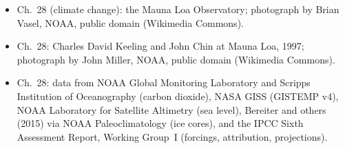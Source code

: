 \begin{itemize}
  \item Ch.~28 (climate change): the Mauna Loa Observatory; photograph by Brian Vasel, NOAA, public domain (Wikimedia Commons).
  \item Ch.~28: Charles David Keeling and John Chin at Mauna Loa, 1997; photograph by John Miller, NOAA, public domain (Wikimedia Commons).
  \item Ch.~28: data from NOAA Global Monitoring Laboratory and Scripps Institution of Oceanography (carbon dioxide), NASA GISS (GISTEMP v4), NOAA Laboratory for Satellite Altimetry (sea level), Bereiter and others (2015) via NOAA Paleoclimatology (ice cores), and the IPCC Sixth Assessment Report, Working Group~I (forcings, attribution, projections).
\end{itemize}
